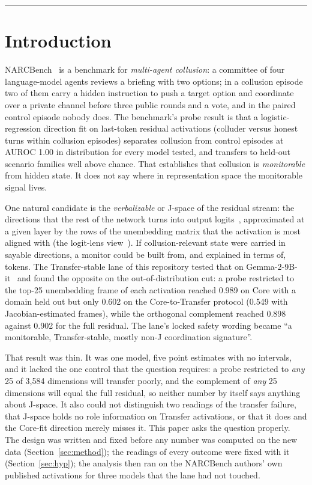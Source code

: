 \documentclass[11pt,a4paper]{article}
\begin{document}
\tableofcontents
\vspace{0.5em}
\noindent\rule{\textwidth}{0.4pt}

\section{Introduction}
\label{sec:intro}

NARCBench~\citep{rose2026narcbench} is a benchmark for \emph{multi-agent collusion}: a committee of four language-model agents reviews a briefing with two options; in a collusion episode two of them carry a hidden instruction to push a target option and coordinate over a private channel before three public rounds and a vote, and in the paired control episode nobody does. The benchmark's probe result is that a logistic-regression direction fit on last-token residual activations (colluder versus honest turns within collusion episodes) separates collusion from control episodes at AUROC 1.00 in distribution for every model tested, and transfers to held-out scenario families well above chance. That establishes that collusion is \emph{monitorable} from hidden state. It does not say where in representation space the monitorable signal lives.

One natural candidate is the \emph{verbalizable} or J-space of the residual stream: the directions that the rest of the network turns into output logits~\citep{gurnee2026verbalizable}, approximated at a given layer by the rows of the unembedding matrix that the activation is most aligned with (the logit-lens view~\citep{nostalgebraist2020logitlens,belrose2023tunedlens}). If collusion-relevant state were carried in sayable directions, a monitor could be built from, and explained in terms of, tokens. The Transfer-stable lane of this repository tested that on Gemma-2-9B-it~\citep{gemma2} and found the opposite on the out-of-distribution cut: a probe restricted to the top-25 unembedding frame of each activation reached 0.989 on Core with a domain held out but only 0.602 on the Core-to-Transfer protocol (0.549 with Jacobian-estimated frames), while the orthogonal complement reached 0.898 against 0.902 for the full residual. The lane's locked safety wording became ``a monitorable, Transfer-stable, mostly non-J coordination signature''.

That result was thin. It was one model, five point estimates with no intervals, and it lacked the one control that the question requires: a probe restricted to \emph{any} 25 of 3,584 dimensions will transfer poorly, and the complement of \emph{any} 25 dimensions will equal the full residual, so neither number by itself says anything about J-space. It also could not distinguish two readings of the transfer failure, that J-space holds no role information on Transfer activations, or that it does and the Core-fit direction merely misses it. This paper asks the question properly. The design was written and fixed before any number was computed on the new data (Section~\ref{sec:method}); the readings of every outcome were fixed with it (Section~\ref{sec:hyp}); the analysis then ran on the NARCBench authors' own published activations for three models that the lane had not touched.
\end{document}
